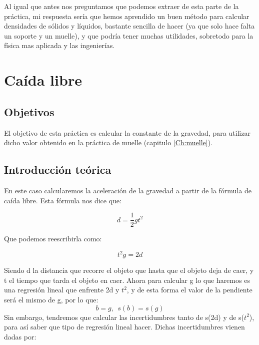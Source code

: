 \documentclass[12pt,a4paper]{book}
\begin{document}
Al igual que antes nos preguntamos que podemos extraer de esta parte de la práctica, mi respuesta sería que hemos aprendido un buen método para calcular densidades de sólidos y líquidos, bastante sencilla de hacer (ya que solo hace falta un soporte y un muelle), y que podría tener muchas utilidades, sobretodo para la física mas aplicada y las ingenierías.


 
 






\chapter{Caída libre }\label{Ch: caída libre} \newpage
\section{Objetivos}
El objetivo de esta práctica es calcular la constante de la gravedad, para utilizar dicho valor obtenido en la práctica de muelle (capitulo \ref{Ch:muelle}).
\section{Introducción teórica}
En este caso calcularemos la aceleración de la gravedad a partir de la fórmula de caída libre. Esta fórmula nos dice que:

\begin{equation}
d=\dfrac{1}{2}gt^2
\label{Ec: ecuación del movimiento caida libre}
\end{equation}

Que podemos reescribirla como: 


\begin{equation}
t^2g=2d
\label{Ec: ecuación que relaciona g con t y d caida libre}
\end{equation}


Siendo d la distancia que recorre el objeto que hasta que el objeto deja de caer, y t el tiempo que tarda el objeto en caer. Ahora para calcular g lo que haremos es una regresión lineal que enfrente 2d y $t^2$, y de esta forma el valor de la pendiente será el mismo de g, por lo que:
$$ b = g, \ \ s(b) = s(g) $$
Sin embargo, tendremos que calcular las incertidumbres tanto de s(2d) y de s($t^2$), para así saber que tipo de regresión lineal hacer. Dichas incertidumbres vienen dadas por: \\
\end{document}
